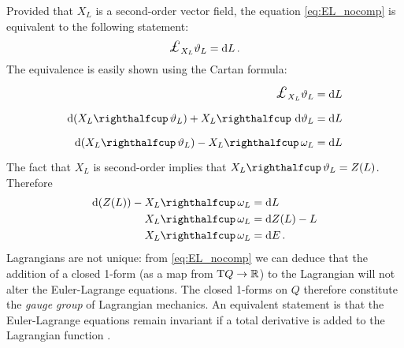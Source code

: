 Provided that \(X_L\) is a second-order vector field, the equation \cref{eq:EL_nocomp} is equivalent to the following statement:
\begin{equation}
    \lied{X_L}{\theta_L} = \dd{L}.
\end{equation}
The equivalence is easily shown using the Cartan formula:
\begin{equation*}
    \begin{split}
        \lied{X_L}{\theta_L} &= \dd{L} \\
        \dd{\qty(\intpr{X_L}{\theta_L})} + \intpr{X_L}{\dd{\theta_L}} &= \dd{L} \\
        \dd{\qty(\intpr{X_L}{\theta_L})} - \intpr{X_L}{\omega_L} &= \dd{L}
    \end{split}
\end{equation*}
The fact that \(X_L\) is second-order implies that \(\intpr{X_L}{\theta_L} = Z(L)\). Therefore 
\begin{equation*}
    \begin{split}
        \dd{(Z(L))} - \intpr{X_L}{\omega_L} &= \dd{L} \\
        \intpr{X_L}{\omega_L} &= \dd{Z(L) - L} \\
        \intpr{X_L}{\omega_L} &= \dd{E}.
    \end{split}
\end{equation*}
Lagrangians are not unique: from \cref{eq:EL_nocomp} we can deduce that the addition of a closed 1-form (as a map from \(\mathrm{T}Q \to \mathbb{R}\)) to the Lagrangian will not alter the Euler-Lagrange equations. The closed 1-forms on \(Q\)  therefore constitute the \emph{gauge group} of Lagrangian mechanics. An equivalent statement is that the Euler-Lagrange equations remain invariant if a total derivative is added to the Lagrangian function \cite{Abraham1978}.
